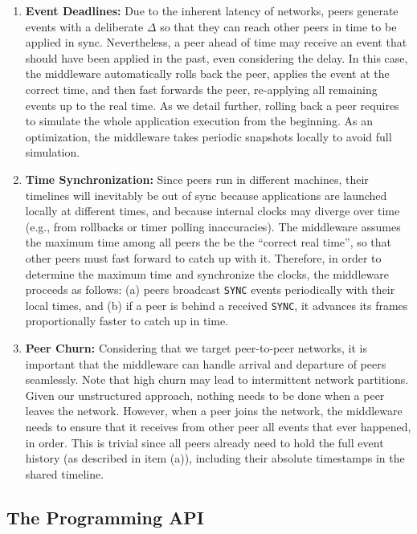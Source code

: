\documentclass[fleqn,10pt]{SelfArx}
\newcommand{\code}[1]  {\texttt{\footnotesize{#1}}}
\begin{document}
\begin{enumerate}
\item \textbf{Event Deadlines:}
Due to the inherent latency of networks, peers generate events with a
deliberate $\Delta$ so that they can reach other peers in time to be applied in
sync.
Nevertheless, a peer ahead of time may receive an event that should have been
applied in the past, even considering the delay.
In this case, the middleware automatically rolls back the peer, applies the
event at the correct time, and then fast forwards the peer, re-applying all
remaining events up to the real time.
As we detail further, rolling back a peer requires to simulate the whole
application execution from the beginning.
As an optimization, the middleware takes periodic snapshots locally to avoid
full simulation.
%
\item \textbf{Time Synchronization:}
Since peers run in different machines, their timelines will inevitably be out
of sync because applications are launched locally at different times, and
because internal clocks may diverge over time (e.g., from rollbacks or timer
polling inaccuracies).
The middleware assumes the maximum time among all peers the be the
``correct real time'', so that other peers must fast forward to catch up with
it.
Therefore, in order to determine the maximum time and synchronize the clocks,
the middleware proceeds as follows:
    (a) peers broadcast \code{SYNC} events periodically with their local
        times, and
    (b) if a peer is behind a received \code{SYNC}, it advances its frames
        proportionally faster to catch up in time.
%
\item \textbf{Peer Churn:}
Considering that we target peer-to-peer networks, it is important that the
middleware can handle arrival and departure of peers seamlessly.
Note that high churn may lead to intermittent network partitions.
Given our unstructured approach, nothing needs to be done when a peer leaves
the network.
However, when a peer joins the network, the middleware needs to ensure that it
receives from other peer all events that ever happened, in order.
This is trivial since all peers already need to hold the full event history (as
described in item (a)), including their absolute timestamps in the shared
timeline.
\end{enumerate}

\subsection{The Programming API}
\label{sec.tml.api}
\end{document}
